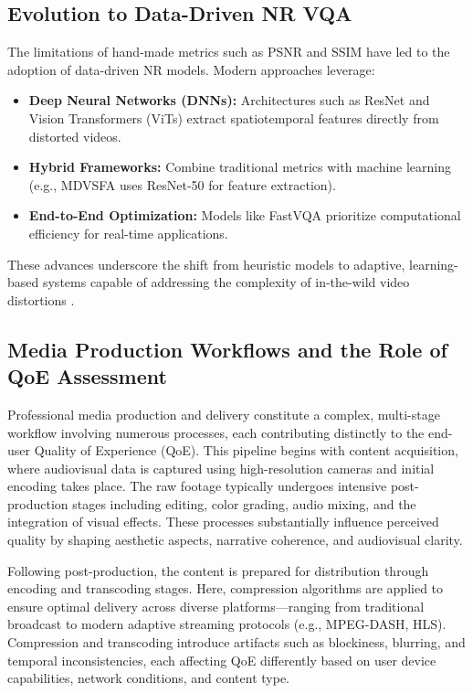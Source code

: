 \subsection{Evolution to Data-Driven NR VQA}  
The limitations of hand-made metrics such as PSNR and SSIM have led to the adoption of data-driven NR models. Modern approaches leverage:  
\begin{itemize}  
    \item \textbf{Deep Neural Networks (DNNs):} Architectures such as ResNet \cite{he2016deep} and Vision Transformers (ViTs) \cite{dosovitskiy2020image} extract spatiotemporal features directly from distorted videos.  
    \item \textbf{Hybrid Frameworks:} Combine traditional metrics with machine learning (e.g., MDVSFA \cite{li2023unified} uses ResNet-50 for feature extraction).  
    \item \textbf{End-to-End Optimization:} Models like FastVQA \cite{wu2022fastvqa} prioritize computational efficiency for real-time applications.  
\end{itemize}  
These advances underscore the shift from heuristic models to adaptive, learning-based systems capable of addressing the complexity of in-the-wild video distortions \cite{min2024perceptual}. 

\subsection{Media Production Workflows and the Role of QoE Assessment}

Professional media production and delivery constitute a complex, multi-stage workflow involving numerous processes, each contributing distinctly to the end-user Quality of Experience (QoE). This pipeline begins with content acquisition, where audiovisual data is captured using high-resolution cameras and initial encoding takes place. The raw footage typically undergoes intensive post-production stages including editing, color grading, audio mixing, and the integration of visual effects. These processes substantially influence perceived quality by shaping aesthetic aspects, narrative coherence, and audiovisual clarity.

Following post-production, the content is prepared for distribution through encoding and transcoding stages. Here, compression algorithms are applied to ensure optimal delivery across diverse platforms—ranging from traditional broadcast to modern adaptive streaming protocols (e.g., MPEG-DASH, HLS). Compression and transcoding introduce artifacts such as blockiness, blurring, and temporal inconsistencies, each affecting QoE differently based on user device capabilities, network conditions, and content type.

